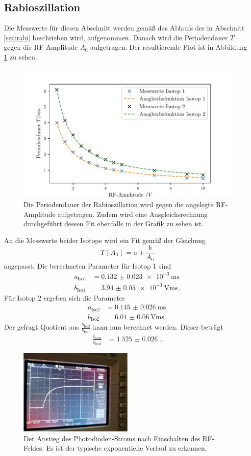 \subsection{Rabioszillation}
Die Messwerte für diesen Abschnitt werden gemäß das Ablaufs der in Abschnitt \ref{sec:rabi} beschrieben wird, aufgenommen.
Danach wird die Periodendauer $T$ gegen die RF-Amplitude $A_0$ aufgetragen.
Der resultierende Plot ist in Abbildung \ref{fig:rabi} zu sehen.
\begin{figure}[H]
    \centering
    \includegraphics[width=\textwidth]{content/plots/periodendauer.pdf}
    \caption{Die Periodendauer der Rabioszillation wird gegen die angelegte RF-Amplitude aufgetragen.
    Zudem wird eine Ausgleichsrechnung durchgeführt dessen Fit ebenfalls in der Grafik zu sehen ist.}
    \label{fig:rabi}
\end{figure}
An die Messwerte beider Isotope wird ein Fit gemäß der Gleichung 
\begin{equation*}
    T(A_0) = a + \frac{b}{A_0}
\end{equation*}
angepasst.
Die berechneten Parameter für Isotop 1 sind 
\begin{align*}
    a_\text{Iso1} &= \SI{0.132(23)e-3}{\ms}\\
    b_\text{Iso1} &= \SI{3.94(5)e-3}{\V\ms} \, .
\end{align*}
Für Isotop 2 ergeben sich die Parameter 
\begin{align*}
    a_\text{Iso2} &= \SI{0.145(26)}{\ms}\\
    b_\text{Iso2} &= \SI{6.01(6)}{\V\ms} \, .
\end{align*}
Der gefragt Quotient aus $\frac{b_\text{Iso2}}{b_\text{Iso1}}$ kann nun berechnet werden.
Dieser beträgt 
\begin{align*}
    \frac{b_\text{Iso2}}{b_\text{Iso1}} &= \SI{1.525(26)}{} \, .
\end{align*}
\begin{figure}[H]
    \centering
    \includegraphics[width=0.5\textwidth]{Data/anstieg.jpeg}
    \caption{Der Anstieg des Photodioden-Stroms nach Einschalten des RF-Feldes.
    Es ist der typische exponentielle Verlauf zu erkennen.}
\end{figure}